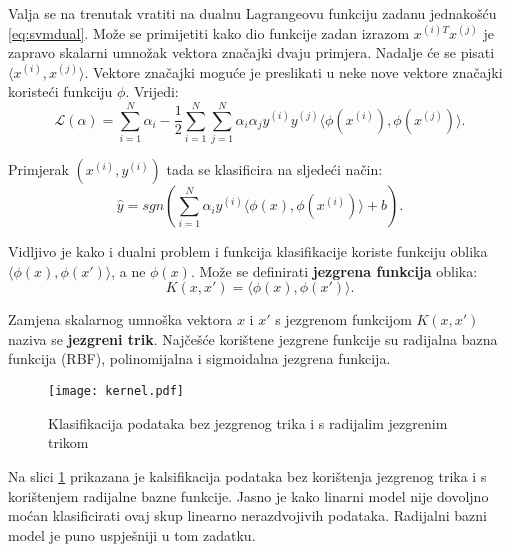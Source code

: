 \documentclass[times, utf8, zavrsni, numeric]{fer}
\begin{document}
\par Valja se na trenutak vratiti na dualnu Lagrangeovu funkciju zadanu jednakošću \ref{eq:svmdual}.
Može se primijetiti kako dio funkcije zadan izrazom $x^{(i)T}x^{(j)}$ je zapravo skalarni umnožak vektora
značajki dvaju primjera. Nadalje će se pisati $\langle x^{(i)},x^{(j)} \rangle$. 
Vektore značajki moguće je preslikati u neke nove vektore značajki koristeći funkciju $\phi$. 
Vrijedi:
\begin{equation*}
  \mathcal{L}(\alpha) = \sum_{i=1}^{N} \alpha_i - 
  \frac{1}{2}\sum_{i=1}^{N}\sum_{j=1}^{N} \alpha_i\alpha_jy^{(i)}y^{(j)}
  \langle \phi(x^{(i)}), \phi(x^{(j)}) \rangle.
\end{equation*}

Primjerak $(x^{(i)}, y^{(i)})$ tada se klasificira na sljedeći način:
\begin{equation*}
  \hat{y} = sgn(\sum_{i=1}^{N} \alpha_iy^{(i)}\langle \phi(x), \phi(x^{(i)}) \rangle
  + b).
\end{equation*}

Vidljivo je kako i dualni problem i funkcija klasifikacije koriste funkciju oblika
$\langle \phi(x), \phi(x') \rangle$, a ne $\phi(x)$. 
Može se definirati \textbf{jezgrena funkcija} oblika:
\begin{equation} \label{eq:trik}
  K(x, x') = \langle \phi(x), \phi(x') \rangle.
\end{equation}

Zamjena skalarnog umnoška vektora $x$ i $x'$ s jezgrenom funkcijom $K(x, x')$ naziva se
\textbf{jezgreni trik}. 
Najčešće korištene jezgrene funkcije su radijalna bazna funkcija (RBF), polinomijalna i 
sigmoidalna jezgrena funkcija. 

\begin{figure}
\centering
\texttt{[image: kernel.pdf]}
\caption{Klasifikacija podataka bez jezgrenog trika i s radijalim jezgrenim trikom}
\label{fig:kernel}
\end{figure}

Na slici \ref{fig:kernel} prikazana je kalsifikacija podataka bez korištenja jezgrenog trika i s 
korištenjem radijalne bazne funkcije. Jasno je kako linarni model nije dovoljno moćan klasificirati
ovaj skup linearno nerazdvojivih podataka. 
Radijalni bazni model je puno uspješniji u tom zadatku.
\end{document}

